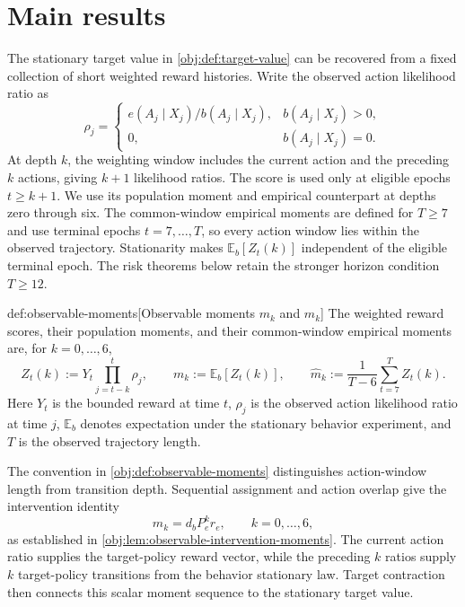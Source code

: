 \section{Main results}

The stationary target value in \cref{obj:def:target-value} can be recovered from a fixed collection of short weighted reward histories. Write the observed action likelihood ratio  as
\[
\rho_j=
\begin{cases}
e(A_j\mid X_j)/b(A_j\mid X_j),&b(A_j\mid X_j)>0,\\
0,&b(A_j\mid X_j)=0.
\end{cases}
\]
At depth \(k\), the weighting window includes the current action and the preceding \(k\) actions, giving \(k+1\) likelihood ratios. The score  is used only at eligible epochs \(t\geq k+1\). We use its population moment  and empirical counterpart  at depths zero through six. The common-window empirical moments are defined for \(T\geq7\) and use terminal epochs \(t=7,\ldots,T\), so every action window lies within the observed trajectory. Stationarity makes \(\mathbb E_b[Z_t(k)]\) independent of the eligible terminal epoch. The risk theorems below retain the stronger horizon condition \(T\geq12\).

\begin{definitionv}{def:observable-moments}[Observable moments $m_k$ and $\widehat m_k$]
The weighted reward scores, their population moments, and their common-window empirical moments are, for \(k=0,\ldots,6\),
\[
Z_t(k)
:=
Y_t\prod_{j=t-k}^{t}\rho_j,
\qquad
m_k
:=
\mathbb E_b[Z_t(k)],
\qquad
\widehat m_k
:=
\frac{1}{T-6}
\sum_{t=7}^{T}Z_t(k).
\]
Here \(Y_t\) is the bounded reward at time \(t\), \(\rho_j\) is the observed action likelihood ratio at time \(j\), \(\mathbb E_b\) denotes expectation under the stationary behavior experiment, and \(T\) is the observed trajectory length.
\end{definitionv}

The convention in \cref{obj:def:observable-moments} distinguishes action-window length from transition depth. Sequential assignment and action overlap give the intervention identity
\[
m_k=d_bP_e^k r_e,\qquad k=0,\ldots,6,
\]
as established in \cref{obj:lem:observable-intervention-moments}. The current action ratio supplies the target-policy reward vector, while the preceding \(k\) ratios supply \(k\) target-policy transitions from the behavior stationary law. Target contraction then connects this scalar moment sequence to the stationary target value.

